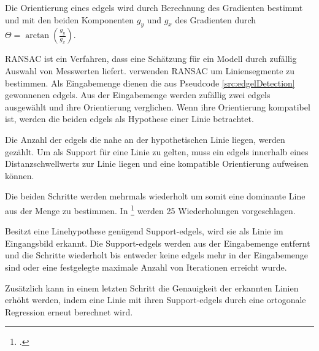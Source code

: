 Die Orientierung eines \gls{edgels} wird durch Berechnung des Gradienten bestimmt und mit den beiden Komponenten $g_y$ und $g_x$ des Gradienten durch $\Theta = \arctan{\left(\frac{g_y}{g_x}\right)}$.

\begin{comment}
	Auf einem engem Samplingraster wird das Eingangsbild mit einem derivative of Gaussian gefaltet und der intensity gradient bestimmt. Ist das lokale maxium des intensity gradient höher als ein festgelegter Schwellwert wird das Pixel als Edgel erkannt und die Orientierung berechnet.
\end{comment}

RANSAC ist ein Verfahren, dass eine Schätzung für ein Modell durch zufällig Auswahl von Messwerten liefert. \citeauthor{clarke96} verwenden RANSAC um Liniensegmente zu bestimmen. Als Eingabemenge dienen die aus Pseudcode \ref{src:edgelDetection} gewonnenen \gls{edgels}. Aus der Eingabemenge werden zufällig zwei \gls{edgels} ausgewählt und ihre Orientierung verglichen. Wenn ihre Orientierung kompatibel ist, werden die beiden \gls{edgels} als Hypothese einer Linie betrachtet.

Die Anzahl der \gls{edgels} die nahe an der hypothetischen Linie liegen, werden gezählt. Um als Support für eine Linie zu gelten, muss ein \gls{edgels} innerhalb eines Distanzschwellwerts zur Linie liegen und eine kompatible Orientierung aufweisen können.

Die beiden Schritte werden mehrmals wiederholt um somit eine dominante Line aus der Menge zu bestimmen. In \citeauthor{clarke96}\footcite[Vgl.][S.~417]{clarke96} werden 25 Wiederholungen vorgeschlagen.

Besitzt eine Linehypothese genügend Support-\gls{edgels}, wird sie als Linie im Eingangsbild erkannt. Die Support-\gls{edgels} werden aus der Eingabemenge entfernt und die Schritte wiederholt bis entweder keine \gls{edgels} mehr in der Eingabemenge sind oder eine festgelegte maximale Anzahl von Iterationen erreicht wurde.

Zusätzlich kann in einem letzten Schritt die Genauigkeit der erkannten Linien erhöht werden, indem eine Linie mit ihren Support-\gls{edgels} durch eine ortogonale Regression erneut berechnet wird.

